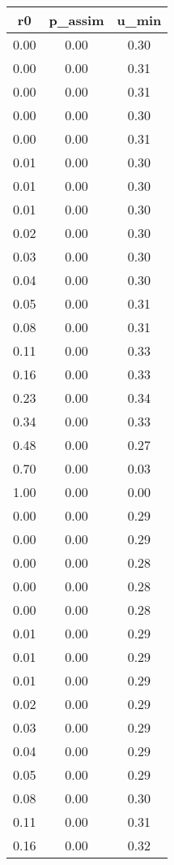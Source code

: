 \begin{table}[ht]
\centering
\begin{table}[ht]
\centering
\begin{tabular}{|ccc}
  \hline
r0 & p_assim & u_min \\ 
  \hline
0.00 & 0.00 & 0.30 \\ 
  0.00 & 0.00 & 0.31 \\ 
  0.00 & 0.00 & 0.31 \\ 
  0.00 & 0.00 & 0.30 \\ 
  0.00 & 0.00 & 0.31 \\ 
  0.01 & 0.00 & 0.30 \\ 
  0.01 & 0.00 & 0.30 \\ 
  0.01 & 0.00 & 0.30 \\ 
  0.02 & 0.00 & 0.30 \\ 
  0.03 & 0.00 & 0.30 \\ 
  0.04 & 0.00 & 0.30 \\ 
  0.05 & 0.00 & 0.31 \\ 
  0.08 & 0.00 & 0.31 \\ 
  0.11 & 0.00 & 0.33 \\ 
  0.16 & 0.00 & 0.33 \\ 
  0.23 & 0.00 & 0.34 \\ 
  0.34 & 0.00 & 0.33 \\ 
  0.48 & 0.00 & 0.27 \\ 
  0.70 & 0.00 & 0.03 \\ 
  1.00 & 0.00 & 0.00 \\ 
  0.00 & 0.00 & 0.29 \\ 
  0.00 & 0.00 & 0.29 \\ 
  0.00 & 0.00 & 0.28 \\ 
  0.00 & 0.00 & 0.28 \\ 
  0.00 & 0.00 & 0.28 \\ 
  0.01 & 0.00 & 0.29 \\ 
  0.01 & 0.00 & 0.29 \\ 
  0.01 & 0.00 & 0.29 \\ 
  0.02 & 0.00 & 0.29 \\ 
  0.03 & 0.00 & 0.29 \\ 
  0.04 & 0.00 & 0.29 \\ 
  0.05 & 0.00 & 0.29 \\ 
  0.08 & 0.00 & 0.30 \\ 
  0.11 & 0.00 & 0.31 \\ 
  0.16 & 0.00 & 0.32 \\ 

\end{tabular}
\end{table}
\end{table}
